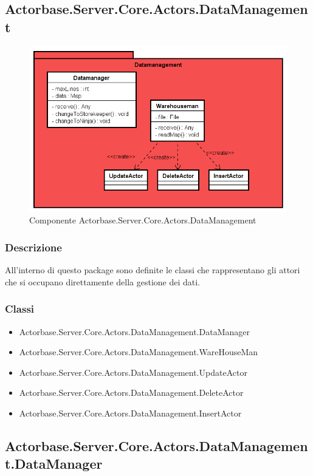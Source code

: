 \documentclass[a4paper]{article}
\begin{document}
			\subsection{Actorbase.Server.Core.Actors.DataManagement}
			\begin{figure} [H]
			\centering
			\includegraphics[scale=0.55]{Server/Package/DatamanagementLevel.png}
			\caption{Componente Actorbase.Server.Core.Actors.DataManagement}
			\end{figure}
			\subsubsection{Descrizione}
				All'interno di questo package sono definite le classi che rappresentano gli attori che si occupano direttamente della gestione dei dati.
			\subsubsection{Classi}
			\begin{itemize}
				\item Actorbase.Server.Core.Actors.DataManagement.DataManager
				\item Actorbase.Server.Core.Actors.DataManagement.WareHouseMan
				\item Actorbase.Server.Core.Actors.DataManagement.UpdateActor
				\item Actorbase.Server.Core.Actors.DataManagement.DeleteActor
				\item Actorbase.Server.Core.Actors.DataManagement.InsertActor
			\end{itemize}
			
		\subsection{Actorbase.Server.Core.Actors.DataManagement.DataManager}
\end{document}
